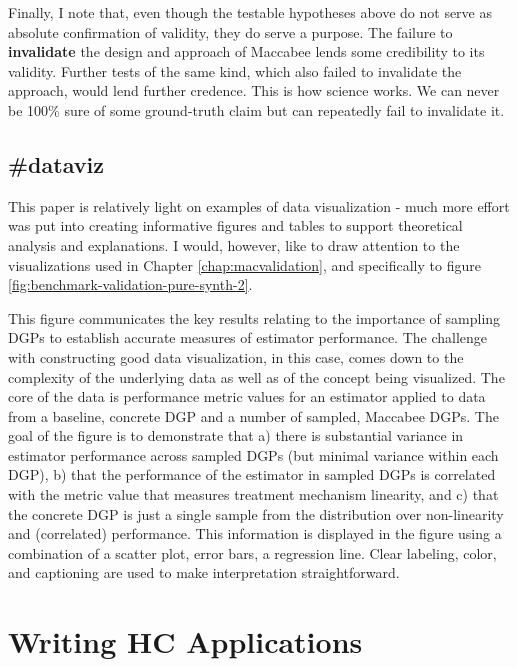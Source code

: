 \documentclass[./main.tex]{subfiles}
\begin{document}
Finally, I note that, even though the testable hypotheses above do not serve as absolute confirmation of validity, they do serve a purpose. The failure to \textbf{invalidate} the design and approach of Maccabee lends some credibility to its validity. Further tests of the same kind, which also failed to invalidate the approach, would lend further credence. This is how science works. We can never be 100\% sure of some ground-truth claim but can repeatedly fail to invalidate it.


\subsection*{\textbf{\#dataviz}}
\label{hc:dataviz}

This paper is relatively light on examples of data visualization - much more effort was put into creating informative figures and tables to support theoretical analysis and explanations. I would, however, like to draw attention to the visualizations used in Chapter \ref{chap:macvalidation}, and specifically to figure \ref{fig:benchmark-validation-pure-synth-2}. 

\vspace{\baselineskip}

This figure communicates the key results relating to the importance of sampling DGPs to establish accurate measures of estimator performance. The challenge with constructing good data visualization, in this case, comes down to the complexity of the underlying data as well as of the concept being visualized. The core of the data is performance metric values for an estimator applied to data from a baseline, concrete DGP and a number of sampled, Maccabee DGPs. The goal of the figure is to demonstrate that a) there is substantial variance in estimator performance across sampled DGPs (but minimal variance within each DGP), b) that the performance of the estimator in sampled DGPs is correlated with the metric value that measures treatment mechanism linearity, and c) that the concrete DGP is just a single sample from the distribution over non-linearity and (correlated) performance. This information is displayed in the figure using a combination of a scatter plot, error bars, a regression line. Clear labeling, color, and captioning are used to make interpretation straightforward.


\section{Writing HC Applications}
\label{hc:section-writing}
\end{document}
